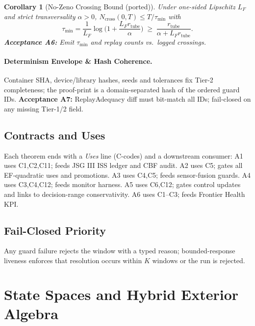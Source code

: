 \documentclass[10pt]{article}
\newtheorem{corollary}{Corollary}
\begin{document}
\begin{corollary}[No-Zeno Crossing Bound (ported)]
Under one-sided Lipschitz $L_F$ and strict transversality $\alpha>0$, $N_{\mathrm{cross}}(0,T)\le T/\tau_{\min}$ with
\[
\tau_{\min}=\frac{1}{L_F}\log\!\Big(1+\frac{L_F r_{\mathrm{tube}}}{\alpha}\Big)\;\ge\;\frac{r_{\mathrm{tube}}}{\alpha+L_F r_{\mathrm{tube}}}.
\]
\textbf{Acceptance A6:} Emit $\tau_{\min}$ and replay counts vs.\ logged crossings.
\end{corollary}

\paragraph{Determinism Envelope \& Hash Coherence.}
Container SHA, device/library hashes, seeds and tolerances fix Tier-2 completeness; the proof-print is a domain-separated hash of the ordered guard IDs. 
\textbf{Acceptance A7:} ReplayAdequacy diff must bit-match all IDs; fail-closed on any missing Tier-1/2 field.

\subsection{Contracts and Uses}
Each theorem ends with a \emph{Uses} line (C-codes) and a downstream consumer:
A1 uses C1,C2,C11; feeds JSG III ISS ledger and CBF audit.
A2 uses C5; gates all EF-quadratic uses and promotions.
A3 uses C4,C5; feeds sensor-fusion guards.
A4 uses C3,C4,C12; feeds monitor harness.
A5 uses C6,C12; gates control updates and links to decision-range conservativity.
A6 uses C1–C3; feeds Frontier Health KPI.

\subsection{Fail-Closed Priority}
Any guard failure rejects the window with a typed reason; bounded-response liveness enforces that resolution occurs within $K$ windows or the run is rejected.

\section{State Spaces and Hybrid Exterior Algebra}\label{sec:calc}

\setcounter{lemma}{0}
\end{document}

